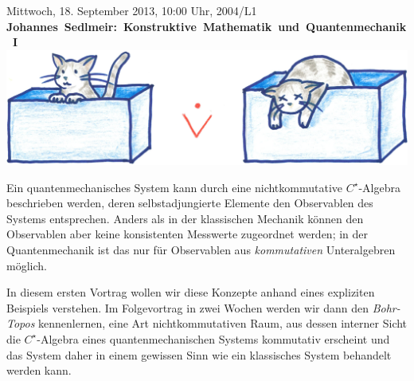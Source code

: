 \documentclass[a4paper,ngerman,landscape]{scrartcl}
\begin{document}
\begin{center}
  \huge
  Mittwoch, 18. September 2013, 10:00 Uhr, 2004/L1 \\
  \mbox{\textbf{Johannes Sedlmeir: Konstruktive Mathematik und Quantenmechanik I}}
  \vfill
  \includegraphics[scale=1.2]{schroedingers-katze}
  \vfill

  \Large
  \begin{minipage}{0.94\textwidth}
    \setlength\parskip{\medskipamount}
    Ein quantenmechanisches System kann durch eine nichtkommutative
    $C^\star$-Algebra beschrieben werden, \mbox{deren} selbstadjungierte Elemente den
    Observablen des Systems entsprechen. Anders als in der klassischen Mechanik
    können den Observablen aber keine konsistenten Messwerte zugeordnet werden;
    in der Quantenmechanik ist das nur für Observablen aus \emph{kommutativen}
    Unteralgebren möglich.

    In diesem ersten Vortrag wollen wir diese Konzepte anhand eines expliziten
    Beispiels verstehen. Im Folgevortrag in zwei Wochen werden wir dann den
    \emph{Bohr-Topos} kennenlernen, eine Art nichtkommutativen Raum, aus dessen
    interner Sicht die $C^\star$-Algebra eines quantenmechanischen Systems
    kommutativ erscheint und das System daher in einem gewissen Sinn wie ein
    klassisches System behandelt werden kann.
  \end{minipage}
\end{center}

\newpage
\end{document}
